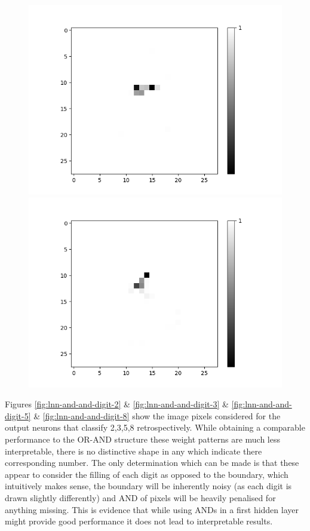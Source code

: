 \begin{figure}[H]
\begin{minipage}[b]{0.45\textwidth}
		\includegraphics[width=\textwidth]{LNN-AND-AND/Neuron-13.png}
		\caption{}
		\label{fig:lnn-and-and-neuron-13}
	\end{minipage}
	\begin{minipage}[b]{0.45\textwidth}
		\includegraphics[width=\textwidth]{LNN-AND-AND/Neuron-28.png}
		\caption{}
		\label{fig:lnn-and-and-neuron-28}
	\end{minipage}
	\hfill
\end{figure}

Figures \ref{fig:lnn-and-and-digit-2} \& \ref{fig:lnn-and-and-digit-3} \& \ref{fig:lnn-and-and-digit-5} \& \ref{fig:lnn-and-and-digit-8} show the image pixels considered for the output neurons that classify 2,3,5,8 retrospectively. While obtaining a comparable performance to the OR-AND structure these weight patterns are much less interpretable, there is no distinctive shape in any which indicate there corresponding number. The only determination which can be made is that these appear to consider the filling of each digit as opposed to the boundary, which intuitively makes sense, the boundary will be inherently noisy (as each digit is drawn slightly differently) and AND of pixels will be heavily penalised for anything missing. This is evidence that while using ANDs in a first hidden layer might provide good performance it does not lead to interpretable results.

